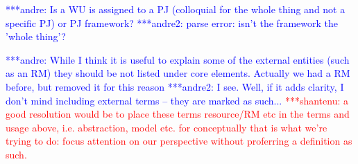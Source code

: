 \documentclass[conference,final]{IEEEtran}
\newcommand{\jhanote}[1]{ {\textcolor{red} { ***shantenu: #1 }}}
\newcommand{\alnote}[1]{ {\textcolor{blue} { ***andre: #1 }}}
\newcommand{\amnote}[1]{ {\textcolor{blue} { ***andre2: #1 }}}
\newcommand{\alnote}[1]{}
\newcommand{\amnote}[1]{}
\newcommand{\jhanote}[1]{}
\begin{document}





\alnote{Is a WU is assigned to a PJ (colloquial for the whole thing
  and not a specific PJ) or PJ framework?}
\amnote{parse error: isn't the framework the 'whole thing'?}




\alnote{While I think it is useful to explain some of the external
  entities (such as an RM) they should be not listed under core
  elements. Actually we had a RM before, but removed it for this
  reason} \amnote{I see.  Well, if it adds clarity, I don't mind
  including external terms -- they are marked as such...}  \jhanote{a
  good resolution would be to place these terms resource/RM etc in the
  terms and usage above, i.e. abstraction, model etc. for conceptually
  that is what we're trying to do: focus attention on our perspective
  without proferring a definition as such. }
\end{document}
